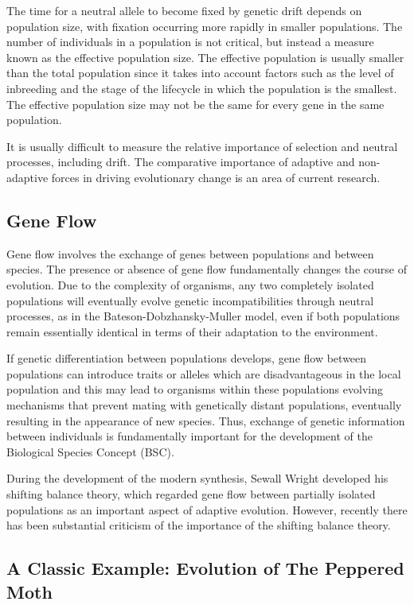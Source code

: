 The time for a neutral allele to become fixed by genetic drift depends on population size, with fixation occurring more rapidly in smaller populations. The number of individuals in a population is not critical, but instead a measure known as the effective population size. The effective population is usually smaller than the total population since it takes into account factors such as the level of inbreeding and the stage of the lifecycle in which the population is the smallest. The effective population size may not be the same for every gene in the same population.

It is usually difficult to measure the relative importance of selection and neutral processes, including drift. The comparative importance of adaptive and non-adaptive forces in driving evolutionary change is an area of current research.

\hypertarget{gene-flow}{%
\subsection{Gene Flow}\label{gene-flow}}

Gene flow involves the exchange of genes between populations and between species. The presence or absence of gene flow fundamentally changes the course of evolution. Due to the complexity of organisms, any two completely isolated populations will eventually evolve genetic incompatibilities through neutral processes, as in the Bateson-Dobzhansky-Muller model, even if both populations remain essentially identical in terms of their adaptation to the environment.

If genetic differentiation between populations develops, gene flow between populations can introduce traits or alleles which are disadvantageous in the local population and this may lead to organisms within these populations evolving mechanisms that prevent mating with genetically distant populations, eventually resulting in the appearance of new species. Thus, exchange of genetic information between individuals is fundamentally important for the development of the Biological Species Concept (BSC).

During the development of the modern synthesis, Sewall Wright developed his shifting balance theory, which regarded gene flow between partially isolated populations as an important aspect of adaptive evolution. However, recently there has been substantial criticism of the importance of the shifting balance theory.

\hypertarget{a-classic-example-evolution-of-the-peppered-moth}{%
\subsection{A Classic Example: Evolution of The Peppered Moth}\label{a-classic-example-evolution-of-the-peppered-moth}}

